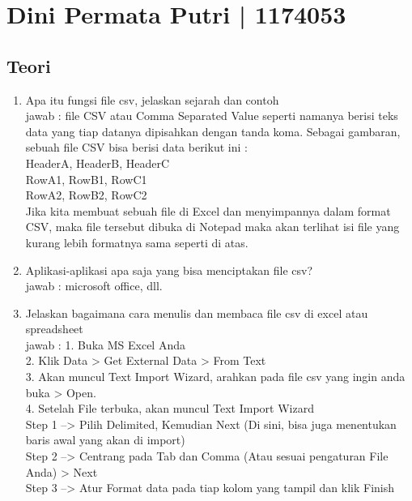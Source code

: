 \section{Dini Permata Putri | 1174053}
\subsection{Teori}
\begin{enumerate}

\item Apa itu fungsi file csv, jelaskan sejarah dan contoh\\
jawab : file CSV atau Comma Separated Value seperti namanya berisi teks data yang tiap datanya dipisahkan dengan tanda koma. Sebagai gambaran, sebuah file CSV bisa berisi data berikut ini :\\
HeaderA, HeaderB, HeaderC\\
RowA1, RowB1, RowC1\\
RowA2, RowB2, RowC2\\
Jika kita membuat sebuah file di Excel dan menyimpannya dalam format CSV, maka file tersebut dibuka di Notepad maka akan terlihat isi file yang kurang lebih formatnya sama seperti di atas.\\

\item Aplikasi-aplikasi apa saja yang bisa menciptakan file csv?\\
jawab : microsoft office, dll.\\

\item Jelaskan bagaimana cara menulis dan membaca file csv di excel atau spreadsheet\\
jawab : 1. Buka MS Excel Anda\\
2. Klik Data > Get External Data > From Text\\ 
3. Akan muncul Text Import Wizard, arahkan pada file csv yang ingin anda buka > Open.\\
4. Setelah File terbuka, akan muncul Text Import Wizard\\
Step 1 –> Pilih Delimited, Kemudian Next (Di sini, bisa juga menentukan baris awal yang akan di import)\\
Step 2 –> Centrang pada Tab dan Comma (Atau sesuai pengaturan File Anda) > Next\\
Step 3 –> Atur Format data pada tiap kolom yang tampil dan klik Finish\\


\end{enumerate}

